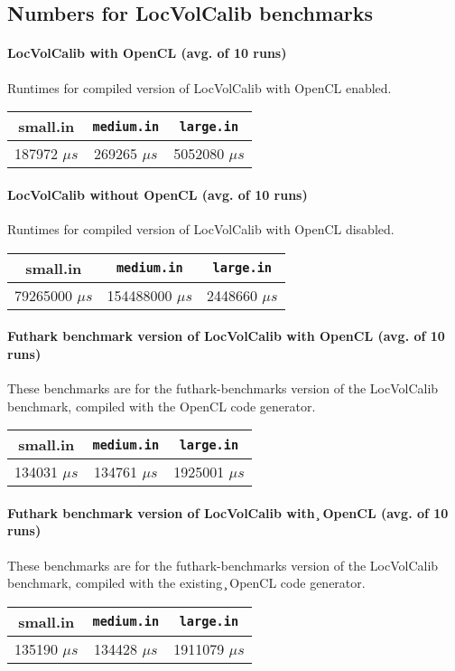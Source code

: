\begin{appendices}
\chapter{Numbers for LocVolCalib benchmarks}




\subsubsection{\fshark{} LocVolCalib with OpenCL (avg. of 10 runs)}
Runtimes for compiled \fshark{} version of LocVolCalib with OpenCL enabled.\\
\begin{tabular}{|c|c|c|}
  \hline
  \textbf{small.in} & \texttt{medium.in} & \texttt{large.in}\\ \hline \hline
187972 $\mu s$& 269265 $\mu s$ &5052080 $\mu s$\\ \hline
\end{tabular}

\subsubsection{\fshark{} LocVolCalib without OpenCL (avg. of 10 runs)}
Runtimes for compiled \fshark{} version of LocVolCalib with OpenCL disabled.\\
\begin{tabular}{|c|c|c|}
  \hline
  \textbf{small.in} & \texttt{medium.in} & \texttt{large.in}\\ \hline \hline
79265000 $\mu s$& 154488000 $\mu s$ & 2448660 $\mu s$\\ \hline
\end{tabular}

\subsubsection{Futhark benchmark version of LocVolCalib with \csharp{} OpenCL (avg. of 10 runs)}
These benchmarks are for the futhark-benchmarks version of the LocVolCalib
benchmark, compiled with the \csharp{} OpenCL code generator.
\begin{tabular}{|c|c|c|}
  \hline
  \textbf{small.in} & \texttt{medium.in} & \texttt{large.in}\\ \hline \hline
134031 $\mu s$& 134761 $\mu s$ & 1925001 $\mu s$\\ \hline
\end{tabular}

\subsubsection{Futhark benchmark version of LocVolCalib with \c{} OpenCL (avg. of 10 runs)}
These benchmarks are for the futhark-benchmarks version of the LocVolCalib
benchmark, compiled with the existing \c{} OpenCL code generator.
\begin{tabular}{|c|c|c|}
  \hline
  \textbf{small.in} & \texttt{medium.in} & \texttt{large.in}\\ \hline \hline
135190 $\mu s$& 134428 $\mu s$ & 1911079 $\mu s$\\ \hline
\end{tabular}


\end{appendices}
